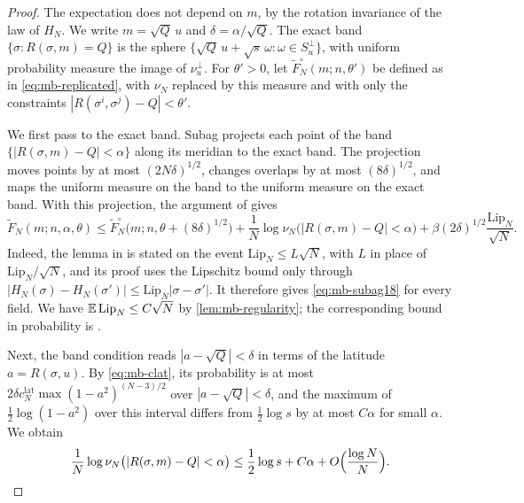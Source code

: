 \begin{proof}
The expectation does not depend on $m$, by the rotation invariance of the law of $H_N$. We write $m=\sqrt Q\,u$ and $\delta=\alpha/\sqrt Q$. The exact band $\{\sigma:R(\sigma,m)=Q\}$ is the sphere $\{\sqrt Q\,u+\sqrt s\,\omega:\omega\in S_u^\perp\}$, with uniform probability measure the image of $\nu_u^\perp$. For $\theta'>0$, let $\widetilde F^\circ_N(m;n,\theta')$ be defined as in \eqref{eq:mb-replicated}, with $\nu_N$ replaced by this measure and with only the constraints $|R(\sigma^i,\sigma^j)-Q|<\theta'$.

We first pass to the exact band. Subag projects each point of the band $\{|R(\sigma,m)-Q|<\alpha\}$ along its meridian to the exact band. The projection moves points by at most $(2N\delta)^{1/2}$, changes overlaps by at most $(8\delta)^{1/2}$, and maps the uniform measure on the band to the uniform measure on the exact band. With this projection, the argument of \cite[Lemma~18, Eq.~(2.2)]{Subag2024} gives
\begin{equation}\label{eq:mb-subag18}
\widetilde F_N(m;n,\alpha,\theta)\le\widetilde F_N^\circ\bigl(m;n,\theta+(8\delta)^{1/2}\bigr)+\frac1N\log\nu_N\bigl(|R(\sigma,m)-Q|<\alpha\bigr)+\beta(2\delta)^{1/2}\frac{\mathrm{Lip}_N}{\sqrt N} .
\end{equation}
Indeed, the lemma in \cite{Subag2024} is stated on the event $\mathrm{Lip}_N\le L\sqrt N$, with $L$ in place of $\mathrm{Lip}_N/\sqrt N$, and its proof uses the Lipschitz bound only through $|H_N(\sigma)-H_N(\sigma')|\le\mathrm{Lip}_N|\sigma-\sigma'|$. It therefore gives \eqref{eq:mb-subag18} for every field. We have $\mathbb E\,\mathrm{Lip}_N\le C\sqrt N$ by \cref{lem:mb-regularity}; the corresponding bound in probability is \cite[Lemma~17]{Subag2024}.

Next, the band condition reads $|a-\sqrt Q|<\delta$ in terms of the latitude $a=R(\sigma,u)$. By \eqref{eq:mb-clat}, its probability is at most $2\delta c_N^{\mathrm{lat}}\max(1-a^2)^{(N-3)/2}$ over $|a-\sqrt Q|<\delta$, and the maximum of $\frac12\log(1-a^2)$ over this interval differs from $\frac12\log s$ by at most $C\alpha$ for small $\alpha$. We obtain
\[
\frac1N\log\nu_N\bigl(|R(\sigma,m)-Q|<\alpha\bigr)\le\frac12\log s+C\alpha+O\Bigl(\frac{\log N}N\Bigr).
\]


\end{proof}
